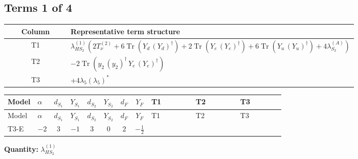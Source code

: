 \documentclass[8pt]{article}
\begin{document}
\begin{landscape}
\subsection*{Terms 1 of 4}
\begin{center}
\begin{tabular}{@{}c >{\raggedright\arraybackslash}p{0.82\linewidth}@{}}
\toprule
Column & Representative term structure \\
\midrule
T1 & \(\displaystyle {\lambda_{HS_2}^{(1)}} (2 T_{\nu}^{(2)}+6 \operatorname{Tr}\!\left({Y_d}\,\left({Y_d}\right)^{\dagger}\right)+2 \operatorname{Tr}\!\left({Y_e}\,\left({Y_e}\right)^{\dagger}\right)+6 \operatorname{Tr}\!\left({Y_u}\,\left({Y_u}\right)^{\dagger}\right)+4 {\lambda_{S_2}^{(A)}})\) \\
\midrule
T2 & \(\displaystyle -2 \operatorname{Tr}\!\left({y_2}\,\left({y_2}\right)^{\dagger}\,{Y_e}\,\left({Y_e}\right)^{\dagger}\right)\) \\
\midrule
T3 & \(\displaystyle +4 {\lambda_5} \left({\lambda_5}\right)^{*}\) \\
\midrule
\bottomrule
\end{tabular}
\end{center}
\smallskip
\tiny
\begin{longtable}{@{}llcccccc >{\raggedright\arraybackslash}p{0.21\linewidth} >{\raggedright\arraybackslash}p{0.21\linewidth} >{\raggedright\arraybackslash}p{0.21\linewidth}@{}}
\toprule
Model & $\alpha$ & $d_{S_1}$ & $Y_{S_1}$ & $d_{S_2}$ & $Y_{S_2}$ & $d_F$ & $Y_F$ & T1 & T2 & T3 \\
\midrule
\endfirsthead
\toprule
Model & $\alpha$ & $d_{S_1}$ & $Y_{S_1}$ & $d_{S_2}$ & $Y_{S_2}$ & $d_F$ & $Y_F$ & T1 & T2 & T3 \\
\midrule
\endhead
T3-E & $-2$ & $3$ & $-1$ & $3$ & $0$ & $2$ & $-\frac{1}{2}$ & \scriptsize\adjustbox{max width=\linewidth}{$\begin{gathered} {\lambda_{HS_2}^{(1)}} (2 T_{\nu}^{(2)}+6 \operatorname{Tr}\!\left({Y_d}\,\left({Y_d}\right)^{\dagger}\right)+2 \operatorname{Tr}\!\left({Y_e}\,\left({Y_e}\right)^{\dagger}\right)+6 \operatorname{Tr}\!\left({Y_u}\,\left({Y_u}\right)^{\dagger}\right)+4 {\lambda_{S_2}^{(A)}})\end{gathered}$} & \scriptsize\adjustbox{max width=\linewidth}{$\begin{gathered} -2 \operatorname{Tr}\!\left({y_2}\,\left({y_2}\right)^{\dagger}\,{Y_e}\,\left({Y_e}\right)^{\dagger}\right)\end{gathered}$} & \scriptsize\adjustbox{max width=\linewidth}{$\begin{gathered} +4 {\lambda_5} \left({\lambda_5}\right)^{*}\end{gathered}$} \\
\midrule
\bottomrule
\end{longtable}
\clearpage
\noindent\textbf{Quantity: }$\lambda_{HS_2}^{(1)}$\par\smallskip

\end{landscape}
\end{document}
